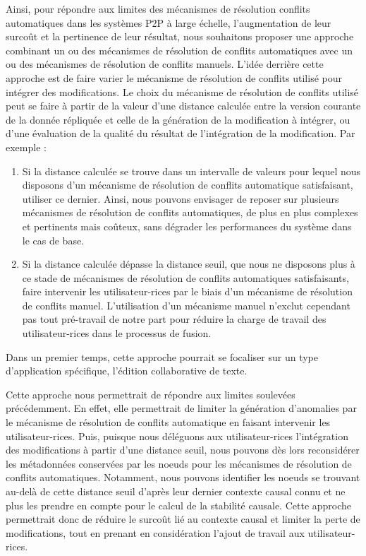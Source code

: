 Ainsi, pour répondre aux limites des mécanismes de résolution conflits automatiques dans les systèmes \ac{P2P} à large échelle, \ie l'augmentation de leur surcoût et la pertinence de leur résultat, nous souhaitons proposer une approche combinant un ou des mécanismes de résolution de conflits automatiques avec un ou des mécanismes de résolution de conflits manuels.
L'idée derrière cette approche est de faire varier le mécanisme de résolution de conflits utilisé pour intégrer des modifications.
Le choix du mécanisme de résolution de conflits utilisé peut se faire à partir de la valeur d'une distance calculée entre la version courante de la donnée répliquée et celle de la génération de la modification à intégrer, ou d'une évaluation de la qualité du résultat de l'intégration de la modification.
Par exemple :
\begin{enumerate}
    \item Si la distance calculée se trouve dans un intervalle de valeurs pour lequel nous disposons d'un mécanisme de résolution de conflits automatique satisfaisant, utiliser ce dernier.
        Ainsi, nous pouvons envisager de reposer sur plusieurs mécanismes de résolution de conflits automatiques, de plus en plus complexes et pertinents mais coûteux, sans dégrader les performances du système dans le cas de base.
    \item Si la distance calculée dépasse la distance seuil, \ie que nous ne disposons plus à ce stade de mécanismes de résolution de conflits automatiques satisfaisants, faire intervenir les utilisateur-rices par le biais d'un mécanisme de résolution de conflits manuel.
        L'utilisation d'un mécanisme manuel n'exclut cependant pas tout pré-travail de notre part pour réduire la charge de travail des utilisateur-rices dans le processus de fusion.
\end{enumerate}
Dans un premier temps, cette approche pourrait se focaliser sur un type d'application spécifique, \eg l'édition collaborative de texte.

Cette approche nous permettrait de répondre aux limites soulevées précédemment.
En effet, elle permettrait de limiter la génération d'anomalies par le mécanisme de résolution de conflits automatique en faisant intervenir les utilisateur-rices.
Puis, puisque nous déléguons aux utilisateur-rices l'intégration des modifications à partir d'une distance seuil, nous pouvons dès lors reconsidérer les métadonnées conservées par les noeuds pour les mécanismes de résolution de conflits automatiques.
Notamment, nous pouvons identifier les noeuds se trouvant au-delà de cette distance seuil d'après leur dernier contexte causal connu et ne plus les prendre en compte pour le calcul de la stabilité causale.
Cette approche permettrait donc de réduire le surcoût lié au contexte causal et limiter la perte de modifications, tout en prenant en considération l'ajout de travail aux utilisateur-rices.\\

